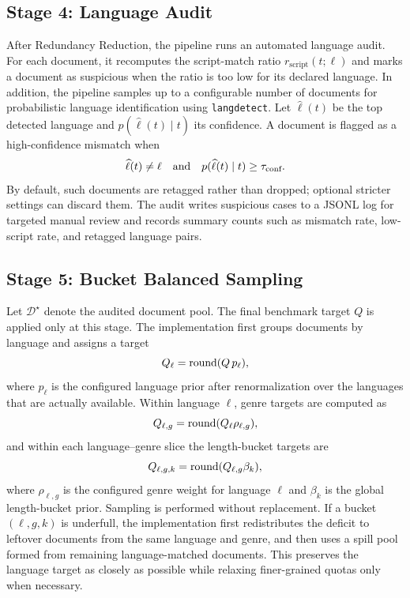 \documentclass{article}
\begin{document}
\subsection{Stage 4: Language Audit}
\label{subsec:construct-post}
{\color{red}After Redundancy Reduction, the pipeline runs an automated language audit. For each document, it recomputes the script-match ratio $r_{\text{script}}(t;\ell)$ and marks a document as suspicious when the ratio is too low for its declared language. In addition, the pipeline samples up to a configurable number of documents for probabilistic language identification using \texttt{langdetect}. Let $\widehat{\ell}(t)$ be the top detected language and $p(\widehat{\ell}(t)\mid t)$ its confidence. A document is flagged as a high-confidence mismatch when}
\[
{\color{red}
\widehat{\ell}(t)\neq \ell
\quad \text{and} \quad
p(\widehat{\ell}(t)\mid t)\ge \tau_{\text{conf}}.
}
\]
{\color{red}By default, such documents are retagged rather than dropped; optional stricter settings can discard them. The audit writes suspicious cases to a JSONL log for targeted manual review and records summary counts such as mismatch rate, low-script rate, and retagged language pairs.}

\subsection{Stage 5: Bucket Balanced Sampling}
\label{subsec:construct-buckets}
{\color{red}Let $\mathcal{D}^{\star}$ denote the audited document pool. The final benchmark target $Q$ is applied only at this stage. The implementation first groups documents by language and assigns a target}
\[
{\color{red}
Q_{\ell}=\mathrm{round}(Q\,p_{\ell}),
}
\]
{\color{red}where $p_{\ell}$ is the configured language prior after renormalization over the languages that are actually available. Within language $\ell$, genre targets are computed as}
\[
{\color{red}
Q_{\ell,g}=\mathrm{round}(Q_{\ell}\rho_{\ell,g}),
}
\]
{\color{red}and within each language--genre slice the length-bucket targets are}
\[
{\color{red}
Q_{\ell,g,k}=\mathrm{round}(Q_{\ell,g}\beta_k),
}
\]
{\color{red}where $\rho_{\ell,g}$ is the configured genre weight for language $\ell$ and $\beta_k$ is the global length-bucket prior. Sampling is performed without replacement. If a bucket $(\ell,g,k)$ is underfull, the implementation first redistributes the deficit to leftover documents from the same language and genre, and then uses a spill pool formed from remaining language-matched documents. This preserves the language target as closely as possible while relaxing finer-grained quotas only when necessary.}
\end{document}
